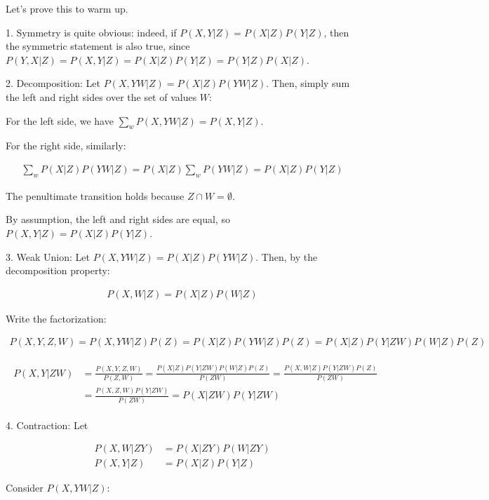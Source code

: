 \documentclass[fleqn]{article}
\numberwithin{equation}{section}
\numberwithin{theorem}{section}
\numberwithin{figure}{section}
\numberwithin{lemma}{section}
\numberwithin{corollary}{section}
\begin{document}
\vspace{0.2cm}

Let's prove this to warm up.

1. Symmetry is quite obvious: indeed, if \( P(X, Y | Z) = P(X | Z)P(Y|Z) \), then the symmetric statement is also true, since \( P(Y, X|Z) = P(X, Y|Z) = P(X|Z)P(Y|Z) = P(Y|Z)P(X|Z) \).

2. Decomposition: Let \( P(X, YW | Z) = P(X|Z)P(YW|Z) \). Then, simply sum the left and right sides over the set of values \( W \):

For the left side, we have \(\sum_{w} P(X, YW|Z) = P(X, Y|Z)\).

For the right side, similarly:

\begin{align}
	\sum_{w} P(X|Z)P(YW|Z) = P(X|Z)\sum_{w} P(YW|Z) = P(X|Z)P(Y|Z)
\end{align}

The penultimate transition holds because \( Z \cap W = \emptyset \).

By assumption, the left and right sides are equal, so \( P(X, Y|Z) = P(X|Z)P(Y|Z) \).

3. Weak Union: Let \( P(X, YW|Z) = P(X|Z)P(YW|Z) \). Then, by the decomposition property:

\begin{align}
	P(X, W|Z) = P(X|Z)P(W|Z)
\end{align}

Write the factorization:

\begin{align}
	P(X, Y, Z, W) = P(X, YW|Z)P(Z) = P(X|Z)P(YW|Z)P(Z) = P(X|Z)P(Y|ZW)P(W|Z)P(Z)
\end{align}

\begin{align}
	\begin{split}
		P(X, Y|ZW) &= \frac{P(X, Y, Z, W)}{P(Z, W)} = \frac{P(X|Z)P(Y|ZW)P(W|Z)P(Z)}{P(ZW)} = \frac{P(X, W|Z)P(Y|ZW)P(Z)}{P(ZW)} \\
		&= \frac{P(X, Z, W)P(Y|ZW)}{P(ZW)} = P(X|ZW)P(Y|ZW)
	\end{split}
\end{align}

4. Contraction: Let

\begin{align}
	P(X, W|ZY) &= P(X|ZY)P(W|ZY)\\
	P(X, Y|Z) &= P(X|Z)P(Y|Z)
\end{align}

Consider \( P(X, YW|Z) \):
\end{document}
